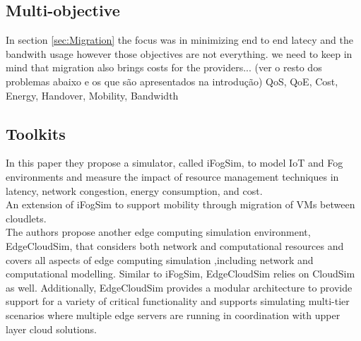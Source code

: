 

\subsection{Multi-objective}
\label{sec:Multiobjective}
In section \ref{sec:Migration} the focus was in minimizing end to end latecy and the bandwith usage however those objectives are not everything. we need to keep in mind that migration also brings costs for the providers... (ver o resto dos problemas abaixo e os que são apresentados na introdução)
QoS, QoE, Cost, Energy, Handover, Mobility, Bandwidth



\subsection{Toolkits}
\label{sec:Toolkits}

\cite{gupta2017ifogsim}
In this paper they propose a simulator, called iFogSim, to model IoT and Fog environments and measure the impact of resource management techniques in latency, network congestion, energy consumption, and cost.\\

\cite{Lopes2017}
An extension of iFogSim to support mobility through migration of VMs between cloudlets.\\

\cite{sonmez2017edgecloudsim}
The authors propose another edge computing simulation environment, EdgeCloudSim, that considers both network and computational resources and covers all aspects of edge computing simulation ,including network and computational modelling. Similar to iFogSim, EdgeCloudSim relies on CloudSim as well. Additionally, EdgeCloudSim provides a modular architecture to provide support for a variety of critical functionality and supports simulating multi-tier scenarios where multiple edge servers are running in coordination with upper layer cloud solutions.

\vfill\pagebreak
